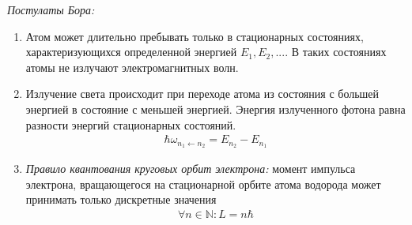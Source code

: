 \documentclass[__main__.tex]{subfiles}
\begin{document}
\textit{Постулаты Бора:}
\begin{enumerate}
	\item Атом может длительно пребывать только в стационарных состояниях, характеризующихся определенной энергией $E_1,E_2,...$. В таких состояниях атомы не излучают электромагнитных волн.
	\item Излучение света происходит при переходе атома из состояния с большей энергией в состояние с меньшей энергией. Энергия излученного фотона равна разности энергий стационарных состояний.
	\begin{gather*}
		\hbar\omega_{n_1 \leftarrow n_2} = E_{n_2} - E_{n_1}
	\end{gather*}
	\item \textit{Правило квантования круговых орбит электрона:} момент импульса электрона, вращающегося на стационарной орбите атома водорода может принимать только дискретные значения
	\begin{gather*}
		\forall n\in\mathbb{N}\colon L = n\hbar
	\end{gather*}
\end{enumerate}
\end{document}
